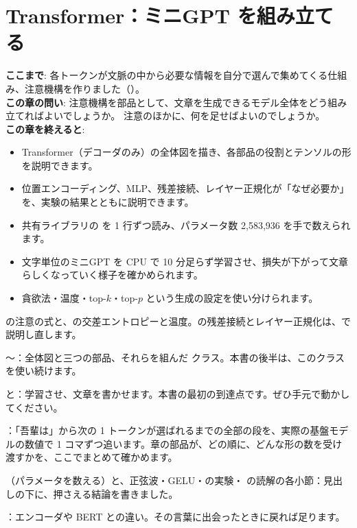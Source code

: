\chapter{Transformer：ミニGPT を組み立てる}\label{ch:transformer}

\begin{chapterlead}
\textbf{ここまで}: 各トークンが文脈の中から必要な情報を自分で選んで集めてくる仕組み、注意機構を作りました（）。\\[1mm]
\textbf{この章の問い}: 注意機構を部品として、文章を生成できるモデル全体をどう組み立てればよいでしょうか。
注意のほかに、何を足せばよいのでしょうか。\\[1mm]
\textbf{この章を終えると}:
\begin{itemize}
\item Transformer（デコーダのみ）の全体図を描き、各部品の役割とテンソルの形を説明できます。
\item 位置エンコーディング、MLP、残差接続、レイヤー正規化が「なぜ必要か」を、実験の結果とともに説明できます。
\item 共有ライブラリの  を 1 行ずつ読み、パラメータ数 2,583,936 を手で数えられます。
\item 文字単位のミニGPT を CPU で 10 分足らず学習させ、損失が下がって文章らしくなっていく様子を確かめられます。
\item 貪欲法・温度・top-$k$・top-$p$ という生成の設定を使い分けられます。
\end{itemize}
\end{chapterlead}

\begin{readingguide}
\item[\rgpre] の注意の式と、の交差エントロピーと温度。の残差接続とレイヤー正規化は、で説明し直します。
\item[\rgmust] 〜：全体図と三つの部品、それらを組んだ  クラス。本書の後半は、このクラスを使い続けます。
\item[\rgmust] と：学習させ、文章を書かせます。本書の最初の到達点です。ぜひ手元で動かしてください。
\item[\rgmust] ：「吾輩は」から次の 1 トークンが選ばれるまでの全部の段を、実際の基盤モデルの数値で 1 コマずつ追います。章の部品が、どの順に、どんな形の数を受け渡すかを、ここでまとめて確かめます。
\item[\rgskim] （パラメータを数える）と、正弦波・GELU・の実験・ の読解の各小節：見出しの下に、押さえる結論を書きました。
\item[\rglater] ：エンコーダや BERT との違い。その言葉に出会ったときに戻れば足ります。
\end{readingguide}

